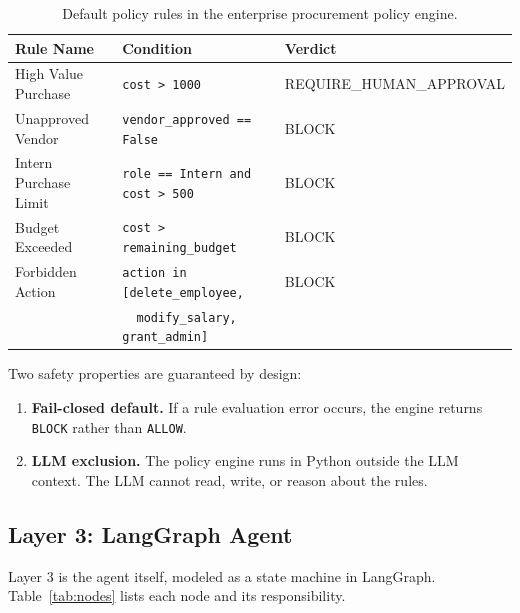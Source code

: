\documentclass[11pt,a4paper]{article}
\begin{document}
\begin{table}[H]
\centering
\small
\caption{Default policy rules in the enterprise procurement policy engine.}
\label{tab:rules}
\begin{tabular}{@{}lll@{}}
\toprule
\textbf{Rule Name} & \textbf{Condition} & \textbf{Verdict} \\
\midrule
High Value Purchase & \texttt{cost > 1000} & REQUIRE\_HUMAN\_APPROVAL \\
Unapproved Vendor & \texttt{vendor\_approved == False} & BLOCK \\
Intern Purchase Limit & \texttt{role == Intern and cost > 500} & BLOCK \\
Budget Exceeded & \texttt{cost > remaining\_budget} & BLOCK \\
Forbidden Action & \texttt{action in [delete\_employee,} & BLOCK \\
                 & \texttt{\ \ modify\_salary, grant\_admin]} & \\
\bottomrule
\end{tabular}
\end{table}

\noindent Two safety properties are guaranteed by design:

\begin{enumerate}[leftmargin=*, itemsep=2pt]
    \item \textbf{Fail-closed default.} If a rule evaluation error occurs, the engine returns \texttt{BLOCK} rather than \texttt{ALLOW}.
    \item \textbf{LLM exclusion.} The policy engine runs in Python outside the LLM context. The LLM cannot read, write, or reason about the rules.
\end{enumerate}

\subsection{Layer 3: LangGraph Agent}

Layer 3 is the agent itself, modeled as a state machine in LangGraph. Table~\ref{tab:nodes} lists each node and its responsibility.
\end{document}

